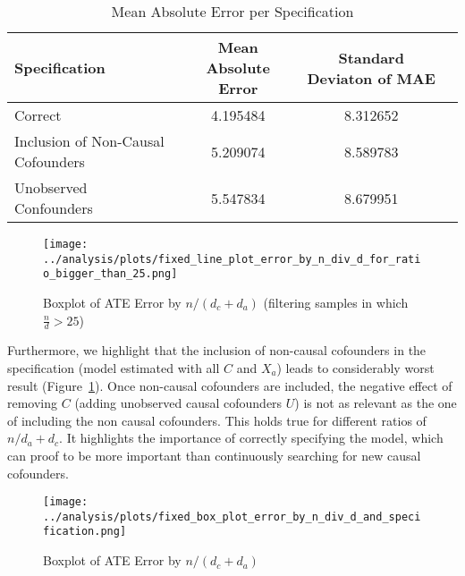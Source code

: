 \documentclass{article}
\numberwithin{equation}{section}
\begin{document}
\begin{table}[H]
    \centering
    \begin{tabular}{lccc}
        \toprule
        Specification & Mean Absolute Error & Standard Deviaton of MAE \\
        \midrule
        Correct & 4.195484 & 8.312652 \\
        Inclusion of Non-Causal Cofounders & 5.209074 & 8.589783 \\
        Unobserved Confounders & 5.547834 & 8.679951 \\
        \bottomrule
    \end{tabular}
    \caption{Mean Absolute Error per Specification}
\end{table}

\begin{figure}[H]
    \centering
    \texttt{[image: ../analysis/plots/fixed\_line\_plot\_error\_by\_n\_div\_d\_for\_ratio\_bigger\_than\_25.png]}
    \caption{Boxplot of ATE Error by $n / (d_c + d_a)$ (filtering samples in which $\frac{n}{d} > 25$)}
    \label{fig:ate_error_by_n_div_d}
\end{figure}

Furthermore, we highlight that the inclusion of non-causal cofounders in the specification (model estimated with all $C$ and $X_a$) leads to considerably worst result (Figure~\ref{fig:ate_error_by_n_div_d}). Once non-causal cofounders are included, the negative effect of removing $C$ (adding unobserved causal cofounders $U$) is not as relevant as the one of including the non causal cofounders. This holds true for different ratios of $n / d_a + d_c$. It highlights the importance of correctly specifying the model, which can proof to be more important than continuously searching for new causal cofounders.

\begin{figure}[H]
    \centering
    \texttt{[image: ../analysis/plots/fixed\_box\_plot\_error\_by\_n\_div\_d\_and\_specification.png]}
    \caption{Boxplot of ATE Error by $n / (d_c + d_a)$}
\end{figure}
\end{document}
